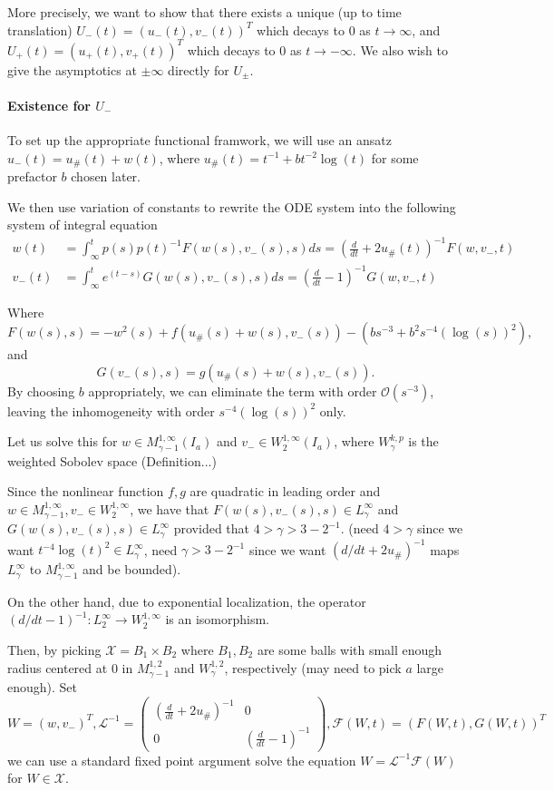 \documentclass[letterpaper,11pt]{article}
\newcommand{\rmO}{\mathcal{O}}
\numberwithin{equation}{section}
\theoremstyle{plain}
\begin{document}
More precisely, we want to show that there exists a unique (up to time translation) $U_-(t) = (u_-(t),v_-(t))^T$ which decays to $0$ as $t \to \infty$, and $U_+(t) = (u_+(t),v_+(t))^T$ which decays to $0$ as $t\to -\infty$. We also wish to give the asymptotics at $\pm \infty$ directly for $U_{\pm}$.

\paragraph{Existence for $U_-$}

To set up the appropriate functional framwork, we will use an ansatz $u_-(t) = u_\#(t) + w(t)$, where $u_\#(t) = t^{-1}+bt^{-2}\log(t)$ for some prefactor $b$ chosen later.

We then use variation of constants to rewrite the ODE system into the following system of integral equation
\begin{align*}
w(t) &= \int_\infty^t p(s)p(t)^{-1} F (w(s),v_-(s),s)ds  = \left(\frac{d}{dt}+2u_\#(t)\right)^{-1} F(w,v_-,t)\\
v_-(t) &= \int_\infty^t e^{(t-s)}G(w(s),v_-(s),s)ds = \left(\frac{d}{dt}-1\right)^{-1} G(w,v_-,t)
\end{align*}

Where 
\[
F(w(s),s) = -w^2(s)+f(u_\#(s)+w(s),v_-(s))-(b s^{-3}+b^2 s^{-4}(\log(s))^2),
\] and 
\[
G(v_-(s),s) = g(u_\#(s)+w(s),v_-(s)).
\]
By choosing $b$ appropriately, we can eliminate the term  with order $\rmO(s^{-3})$, leaving the inhomogeneity with order $s^{-4}(\log(s))^2$ only.

Let us solve this for $w \in M^{1,\infty}_{\gamma-1}(I_a)$ and $v_- \in W^{1, \infty}_{2}(I_a)$, where $W^{k,p}_{\gamma}$ is the weighted Sobolev space (Definition...)

Since the nonlinear function $f,g$ are quadratic in leading order and $w \in M^{1,\infty}_{\gamma-1}, v_- \in W^{1,\infty}_{2}$, we have that $F(w(s),v_-(s),s) \in L^{\infty}_{\gamma}$ 
and $G(w(s),v_-(s),s) \in L^{\infty}_{\gamma}$ provided that $4>\gamma >3-2^{-1}$. (need $4>\gamma$ since we want $t^{-4}\log(t)^2 \in L^{\infty}_{\gamma}$, need $\gamma>3-2^{-1}$ since we want $(d/dt+2u_\#)^{-1}$ maps $L^{\infty}_{\gamma}$ to $M^{1,\infty}_{\gamma-1}$ and be bounded).

On the other hand, due to exponential localization, the operator $(d/dt-1)^{-1}: L_2^{\infty} \to W^{1,\infty}_2$ is an isomorphism. 

Then, by picking $\mathcal{X} = B_1 \times B_2$ where $B_1, B_2$ are some balls with small enough radius centered at $0$ in $M_{\gamma-1}^{1,2}$ and $W_\gamma^{1,2}$, respectively (may need to pick $a$ large enough).
 Set 
 \[
 W= (w,v_-)^T, \mathcal{L}^{-1} = \begin{pmatrix}
 (\frac{d}{dt}+2u_\#)^{-1} & 0\\
0&(\frac{d}{dt}-1)^{-1}
 \end{pmatrix}, \mathcal{F}(W,t) = (F(W,t),G(W,t))^T
 \] we can use a standard fixed point argument solve the equation $W= \mathcal{L}^{-1} \mathcal{F}(W)$ for $W \in \mathcal{X}$.
\end{document}
